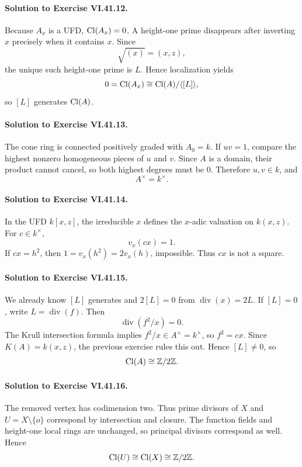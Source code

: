 \paragraph{Solution to Exercise VI.41.12.}
Because \(A_x\) is a UFD, \(\operatorname{Cl}(A_x)=0\). A height-one prime disappears after
inverting \(x\) precisely when it contains \(x\). Since
\[
\sqrt{(x)}=(x,z),
\]
the unique such height-one prime is \(L\). Hence localization yields
\[
0=\operatorname{Cl}(A_x)\cong\operatorname{Cl}(A)/\langle[L]\rangle,
\]
so \([L]\) generates \(\operatorname{Cl}(A)\).

\paragraph{Solution to Exercise VI.41.13.}
The cone ring is connected positively graded with \(A_0=k\). If \(uv=1\), compare
the highest nonzero homogeneous pieces of \(u\) and \(v\). Since \(A\) is a domain,
their product cannot cancel, so both highest degrees must be \(0\). Therefore
\(u,v\in k\), and
\[
A^\times=k^\times.
\]

\paragraph{Solution to Exercise VI.41.14.}
In the UFD \(k[x,z]\), the irreducible \(x\) defines the \(x\)-adic valuation on
\(k(x,z)\). For \(c\in k^\times\),
\[
v_x(cx)=1.
\]
If \(cx=h^2\), then \(1=v_x(h^2)=2v_x(h)\), impossible. Thus \(cx\) is not a square.

\paragraph{Solution to Exercise VI.41.15.}
We already know \([L]\) generates and \(2[L]=0\) from
\(\operatorname{div}(x)=2L\). If \([L]=0\), write \(L=\operatorname{div}(f)\). Then
\[
\operatorname{div}(f^2/x)=0.
\]
The Krull intersection formula implies \(f^2/x\in A^\times=k^\times\), so
\(f^2=cx\). Since \(K(A)=k(x,z)\), the previous exercise rules this out.
Hence \([L]\neq0\), so
\[
\operatorname{Cl}(A)\cong\mathbb Z/2\mathbb Z.
\]

\paragraph{Solution to Exercise VI.41.16.}
The removed vertex has codimension two. Thus prime divisors of \(X\) and
\(U=X\setminus\{o\}\) correspond by intersection and closure. The function fields and
height-one local rings are unchanged, so principal divisors correspond as well. Hence
\[
\operatorname{Cl}(U)\cong\operatorname{Cl}(X)\cong\mathbb Z/2\mathbb Z.
\]

